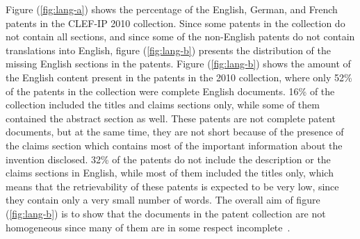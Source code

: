 Figure (\ref{fig:lang-a}) shows the percentage of the English, German, and French patents in the CLEF-IP 2010 collection. Since some patents in the collection do not contain all sections, and since some of the non-English patents do not contain translations into English, figure (\ref{fig:lang-b}) presents the distribution of the missing English sections in the patents. Figure (\ref{fig:lang-b}) shows the amount of the English content present in the patents in the 2010 collection, where only 52\% of the patents in the collection were complete English documents. 16\% of the collection included the titles and claims sections only, while some of them contained the abstract section as well. These patents are not complete patent documents, but at the same time, they are not short because of the presence of the claims section which contains most of the important information about the invention disclosed. 32\% of the patents do not include the description or the claims sections in English, while most of them included the titles only, which means that the retrievability of these patents is expected to be very low, since they contain only a very small number of words. The overall aim of figure (\ref{fig:lang-b}) is to show that the documents in the patent collection are not homogeneous since many of them are in some respect incomplete~\citep{magdy2012toward}.
